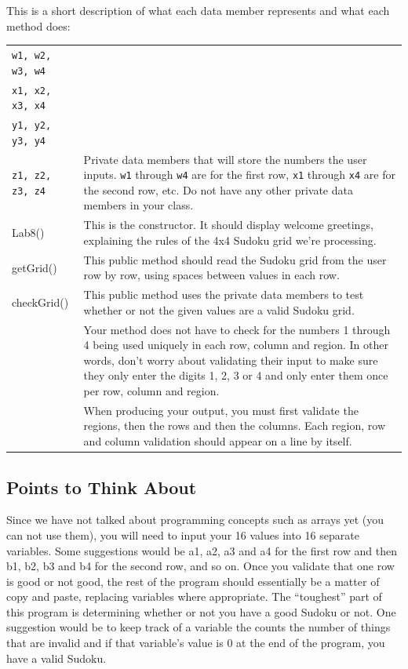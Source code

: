 \vspace*{.05in}
\noindent This is a short description of what each data member represents and what each method does:\\

\begin{tabular}{|l|p{10cm}|}
\hline
{\tt w1, w2, w3, w4} &  \\
{\tt x1, x2, x3, x4} & \\
{\tt y1, y2, y3, y4} & \\
{\tt z1, z2, z3, z4}	&  Private data members that will store the numbers the user inputs.  {\tt w1} through {\tt w4} are for the first row, {\tt x1} through {\tt x4} are for the second row, etc.  Do not have any other private data members in your class.\\
\hline
Lab8()	&This is the constructor.  It should display welcome greetings, explaining the rules of the 4x4 Sudoku grid we're processing.\\
\hline
getGrid()	& This public method should read the Sudoku grid from the user row by row, using spaces between values in each row.\\
\hline 
checkGrid() &	This public method uses the private data members to test whether or not the given values are a valid Sudoku grid.\\
& Your method does not have to check for the numbers 1 through 4 being used uniquely in each row, column and region.  In other words, don't worry about validating their input to make sure they only enter the digits 1, 2, 3 or 4 and only enter them once per row, column and region. \\ 
& When producing your output, you must first validate the regions, then the rows and then the columns.  Each region, row and column validation should appear on a line by itself. \\
\hline
\end{tabular}

\vspace{-0.05in}
\subsection*{Points to Think About}
\vspace{-0.05in}
Since we have not talked about programming concepts such as arrays yet (you can not use them), you will need to input your 16 values into 16 separate variables.  Some suggestions would be a1, a2, a3 and a4 for the first row and then b1, b2, b3 and b4 for the second row, and so on.
Once you validate that one row is good or not good, the rest of the program should essentially be a matter of copy and paste, replacing variables where appropriate.
The ``toughest'' part of this program is determining whether or not you have a good Sudoku or not.  One suggestion would be to keep track of a variable the counts the number of things that are invalid and if that variable's value is 0 at the end of the program, you have a valid Sudoku.

